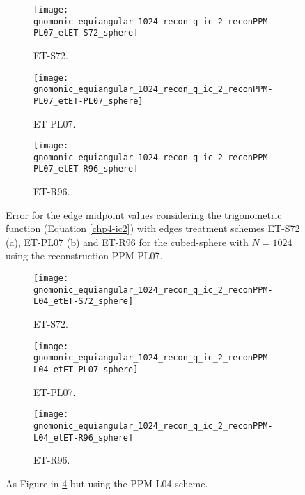 \begin{figure}[!htb]
	\centering
	\begin{subfigure}{0.49\textwidth}
		\centering
		\texttt{[image: gnomonic\_equiangular\_1024\_recon\_q\_ic\_2\_reconPPM-PL07\_etET-S72\_sphere]}
		\caption{ET-S72.\label{chp4-exp4-a}}
	\end{subfigure}
	\begin{subfigure}{0.49\textwidth}
		\centering
		\texttt{[image: gnomonic\_equiangular\_1024\_recon\_q\_ic\_2\_reconPPM-PL07\_etET-PL07\_sphere]}
		\caption{ET-PL07.\label{chp4-exp4-b}}
	\end{subfigure}
	\begin{subfigure}{0.49\textwidth}
	\centering
	\texttt{[image: gnomonic\_equiangular\_1024\_recon\_q\_ic\_2\_reconPPM-PL07\_etET-R96\_sphere]}
	\caption{ET-R96.\label{chp4-exp4-c}}
\end{subfigure}
	\caption{Error for the edge midpoint values considering the trigonometric function (Equation \eqref{chp4-ic2})
	with edges treatment schemes ET-S72 (a), ET-PL07 (b) and ET-R96 for the cubed-sphere with $N=1024$ using the reconstruction PPM-PL07.\label{chp4-exp4}}
\end{figure}

\begin{figure}[!htb]
	\centering
	\begin{subfigure}{0.49\textwidth}
		\centering
		\texttt{[image: gnomonic\_equiangular\_1024\_recon\_q\_ic\_2\_reconPPM-L04\_etET-S72\_sphere]}
		\caption{ET-S72.\label{chp4-exp5-a}}
	\end{subfigure}
	\begin{subfigure}{0.49\textwidth}
		\centering
		\texttt{[image: gnomonic\_equiangular\_1024\_recon\_q\_ic\_2\_reconPPM-L04\_etET-PL07\_sphere]}
		\caption{ET-PL07.\label{chp4-exp5-b}}
	\end{subfigure}
	\begin{subfigure}{0.49\textwidth}
		\centering
		\texttt{[image: gnomonic\_equiangular\_1024\_recon\_q\_ic\_2\_reconPPM-L04\_etET-R96\_sphere]}
		\caption{ET-R96.\label{chp4-exp5-c}}
	\end{subfigure}
	\caption{As Figure in \ref{chp4-exp4} but using the PPM-L04 scheme.\label{chp4-exp5}}
\end{figure}


